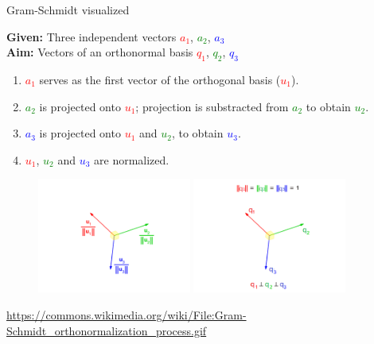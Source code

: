 \documentclass[11pt,compress,t,notes=noshow, xcolor=table]{beamer}
\begin{document}
\begin{vbframe}{Gram-Schmidt visualized}
\framebreak

\begin{scriptsize}

\textbf{Given:} Three independent vectors \textcolor{red}{$a_1$}, \textcolor{green}{$a_2$}, \textcolor{blue}{$a_3$} \\
\textbf{Aim:} Vectors of an orthonormal basis \textcolor{red}{$q_1$}, \textcolor{green}{$q_2$}, \textcolor{blue}{$q_3$}

\begin{enumerate}
  \item<2-> \textcolor{red}{$a_1$} serves as the first vector of the orthogonal basis (\textcolor{red}{$u_1$}).
  \item<3-> \textcolor{green}{$a_2$} is projected onto \textcolor{red}{$u_1$}; projection is substracted from \textcolor{green}{$a_2$}
        to obtain \textcolor{green}{$u_2$}.
  \item<4-> \textcolor{blue}{$a_3$} is projected onto \textcolor{red}{$u_1$} and \textcolor{green}{$u_2$},
        to obtain \textcolor{blue}{$u_3$}.
  \item \textcolor{red}{$u_1$}, \textcolor{green}{$u_2$} and \textcolor{blue}{$u_3$} are normalized.
\end{enumerate}

\end{scriptsize}

\begin{figure}
  \centering
  \includegraphics[width=0.45\textwidth]{figure_man/frame_144_delay-3s.png}
  \includegraphics[width=0.45\textwidth]{figure_man/frame_149_delay-8s.png}
\end{figure}
\tiny{\url{https://commons.wikimedia.org/wiki/File:Gram-Schmidt_orthonormalization_process.gif}}

\end{vbframe}
\end{document}
